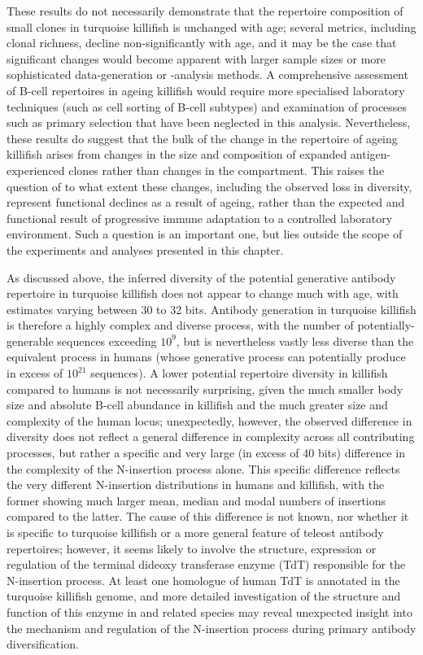 These results do not necessarily demonstrate that the repertoire composition of small clones in turquoise killifish is unchanged with age; several metrics, including clonal richness, decline non-significantly with age, and it may be the case that significant changes would become apparent with larger sample sizes or more sophisticated data-generation or -analysis methods. A comprehensive assessment of \naive B-cell repertoires in ageing killifish would require more specialised laboratory techniques (such as cell sorting of B-cell subtypes) and examination of processes such as primary selection that have been neglected in this analysis. Nevertheless, these results do suggest that the bulk of the change in the  repertoire of ageing killifish arises from changes in the size and composition of expanded antigen-experienced clones rather than changes in the \naive compartment. This raises the question of to what extent these changes, including the observed loss in diversity, represent functional declines as a result of ageing, rather than the expected and functional result of progressive immune adaptation to a controlled laboratory environment. Such a question is an important one, but lies outside the scope of the experiments and analyses presented in this chapter. %

As discussed above, the inferred diversity of the potential generative antibody repertoire in turquoise killifish does not appear to change much with age, with estimates varying between 30 to 32 bits. Antibody generation in turquoise killifish is therefore a highly complex and diverse process, with the number of potentially-generable sequences exceeding $10^9$, but is nevertheless  vastly less diverse than the equivalent process in humans (whose generative process can potentially produce in excess of $10^{21}$ sequences). A lower potential repertoire diversity in killifish compared to humans is not necessarily surprising, given the much smaller body size and absolute B-cell abundance in killifish and the much greater size and complexity of the human \igh{} locus; unexpectedly, however, the observed difference in diversity does not reflect a general difference in complexity across all contributing processes, but rather a specific and very large (in excess of 40 bits) difference in the complexity of the N-insertion process alone. This specific difference reflects the very different N-insertion distributions in humans and killifish, with the former showing much larger mean, median and modal numbers of insertions compared to the latter. The cause of this difference is not known, nor whether it is specific to turquoise killifish or a more general feature of teleost antibody repertoires; however, it seems likely to involve the structure, expression or regulation of the terminal dideoxy transferase enzyme (TdT) responsible for the N-insertion process. At least one homologue of human TdT is annotated in the turquoise killifish genome, and more detailed investigation of the structure and function of this enzyme in \nfu and related species may reveal unexpected insight into the mechanism and regulation of the N-insertion process during primary antibody diversification.

